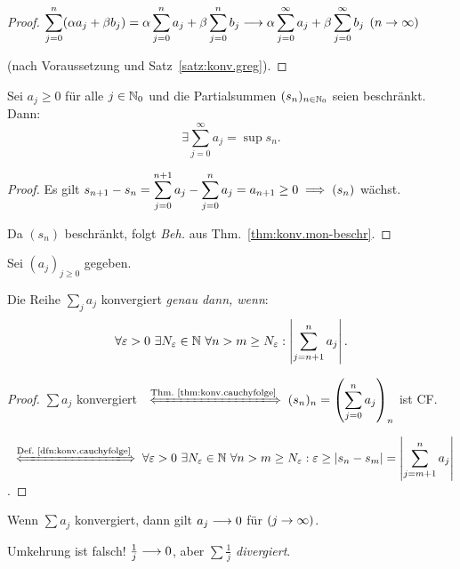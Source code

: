 \documentclass[12pt]{scrreprt}
\begin{document}
\begin{proof}
$\displaystyle\sum^n_{j=0}(\alpha a_j +\beta b_j) = \alpha\sum^n_{j=0}a_j + \beta\sum^n_{j=0}b_j\longrightarrow\alpha\sum^\infty_{j=0}a_j+\beta\sum^\infty_{j=0}b_j$ $(n\rightarrow\infty)$

(nach Voraussetzung und Satz~\ref{satz:konv.greg}).
\end{proof}

\begin{satz}
  \label{satz:reihen.beschr-gwert}
  Sei $a_j\geq 0$ für alle $j\in\mathbb{N}_0$ und die Partialsummen $(s_n)_{n\in\mathbb{N}_0}$ seien beschränkt. Dann:
  \[\exists\sum^\infty_{j=0}a_j = \sup s_n.\]
\end{satz}

\begin{proof} Es gilt $\displaystyle s_{n+1}-s_n=\sum^{n+1}_{j=0}a_j - \sum^n_{j=0}a_j = a_{n+1} \geq 0\implies (s_n)$ wächst.

Da $(s_n)$ beschränkt, folgt \textit{Beh.} aus Thm.~\ref{thm:konv.mon-beschr}.
\end{proof}

\begin{satz}
  \label{satz:reihen.cauchy-krit}
  Sei $(a_j)_{j\geq 0}$ gegeben.
  
  Die Reihe $\sum_j a_j$ konvergiert \textit{genau dann, wenn}:
  \begin{equation}\label{eqn:reihen.cauchy}
  \forall\varepsilon > 0\ \exists N_\varepsilon\in\mathbb{N}\ \forall n>m\geq N_\varepsilon: \left\lvert\sum^n_{j=n+1}a_j\right\lvert.
  \end{equation}
\end{satz}

\begin{proof}$\sum a_j$ konvergiert $\displaystyle\gdwnach{\text{Thm.~\ref{thm:konv.cauchyfolge}}}(s_n)_n = \left(\sum^n_{j=0}a_j\right)_n$ ist CF.

$\displaystyle\gdwnach{\text{Def.~\ref{dfn:konv.cauchyfolge}}}\forall\ep > 0\ \exists\nat{N_\ep}\ \forall n > m\geq N_\ep: \ep\geq\abs{s_n-s_m}=\abs{\sum^n_{j=m+1}a_j}$.
\end{proof}

\begin{kor}
  \label{kor:reihen.konv-nf}
  Wenn $\sum a_j$ konvergiert, dann gilt $a_j\longrightarrow 0$ für $(j\rightarrow\infty)$.
\end{kor}

\begin{bem*} Umkehrung ist falsch! $\frac{1}{j}\longrightarrow 0$, aber $\sum\frac{1}{j}$ \textit{divergiert}.
\end{bem*}
\end{document}
